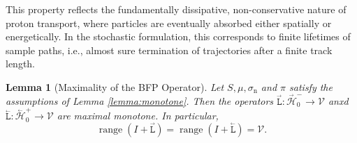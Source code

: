 \documentclass{amsart}
\newcommand{\fL}{\stackrel{_\rightarrow}{\mathtt L}}
\newcommand{\bL}{\stackrel{_\leftarrow}{\mathtt L}}
\theoremstyle{plain}
\newtheorem{lemma}[theorem]{Lemma}
\newcommand{\cH}{\stackrel{_\rightarrow}{\mathscr H}}
\newcommand{\cbH}{\stackrel{_\leftarrow}{\mathscr H}}
\newcommand{\cV}{\ensuremath{\mathscr V}}
\begin{document}
This property reflects the fundamentally dissipative, non-conservative
nature of proton transport, where particles are eventually absorbed
either spatially or energetically. In the stochastic formulation, this
corresponds to finite lifetimes of sample paths, i.e., almost sure
termination of trajectories after a finite track length.

\begin{lemma}[Maximality of the BFP Operator]\label{lemma:closure_and_ker_0}
  Let $S, \mu, \sigma_{\mathrm{n}}$ and $\pi$ satisfy the assumptions of
  Lemma \ref{lemma:monotone}. Then the operators $\fL : \cH_0^- \to
  \cV$ anxd $\bL : \cbH_0^+ \to \cV$ are maximal monotone. In particular,
  \begin{equation}
    \operatorname{range}(I + \fL) = \operatorname{range}(I + \bL) = \cV.
  \end{equation}
\end{lemma}
\end{document}
